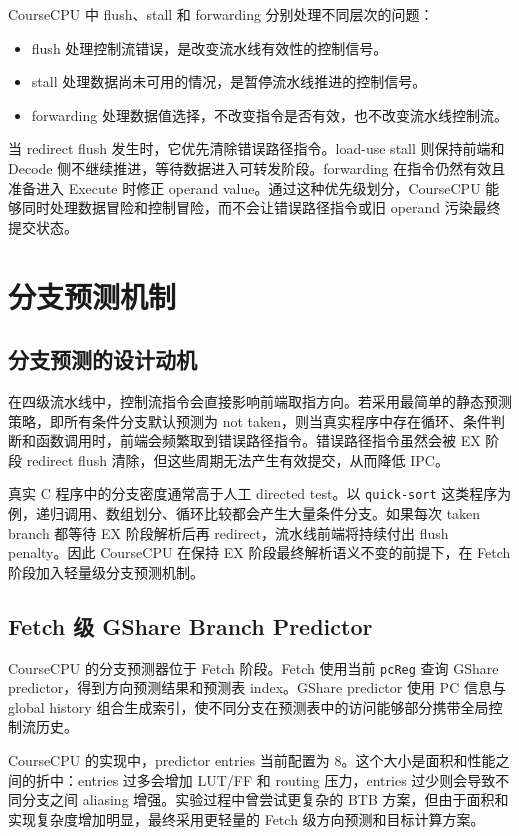 \documentclass[UTF8,a4paper,12pt]{ctexrep}
\begin{document}
CourseCPU 中 flush、stall 和 forwarding 分别处理不同层次的问题：

\begin{itemize}
  \item flush 处理控制流错误，是改变流水线有效性的控制信号。
  \item stall 处理数据尚未可用的情况，是暂停流水线推进的控制信号。
  \item forwarding 处理数据值选择，不改变指令是否有效，也不改变流水线控制流。
\end{itemize}

当 redirect flush 发生时，它优先清除错误路径指令。load-use stall 则保持前端和 Decode 侧不继续推进，等待数据进入可转发阶段。forwarding 在指令仍然有效且准备进入 Execute 时修正 operand value。通过这种优先级划分，CourseCPU 能够同时处理数据冒险和控制冒险，而不会让错误路径指令或旧 operand 污染最终提交状态。

\chapter{分支预测机制}

\section{分支预测的设计动机}

在四级流水线中，控制流指令会直接影响前端取指方向。若采用最简单的静态预测策略，即所有条件分支默认预测为 not taken，则当真实程序中存在循环、条件判断和函数调用时，前端会频繁取到错误路径指令。错误路径指令虽然会被 EX 阶段 redirect flush 清除，但这些周期无法产生有效提交，从而降低 IPC。

真实 C 程序中的分支密度通常高于人工 directed test。以 \texttt{quick-sort} 这类程序为例，递归调用、数组划分、循环比较都会产生大量条件分支。如果每次 taken branch 都等待 EX 阶段解析后再 redirect，流水线前端将持续付出 flush penalty。因此 CourseCPU 在保持 EX 阶段最终解析语义不变的前提下，在 Fetch 阶段加入轻量级分支预测机制。

\section{Fetch 级 GShare Branch Predictor}

CourseCPU 的分支预测器位于 Fetch 阶段。Fetch 使用当前 \texttt{pcReg} 查询 GShare predictor，得到方向预测结果和预测表 index。GShare predictor 使用 PC 信息与 global history 组合生成索引，使不同分支在预测表中的访问能够部分携带全局控制流历史。

CourseCPU 的实现中，predictor entries 当前配置为 8。这个大小是面积和性能之间的折中：entries 过多会增加 LUT/FF 和 routing 压力，entries 过少则会导致不同分支之间 aliasing 增强。实验过程中曾尝试更复杂的 BTB 方案，但由于面积和实现复杂度增加明显，最终采用更轻量的 Fetch 级方向预测和目标计算方案。
\end{document}
